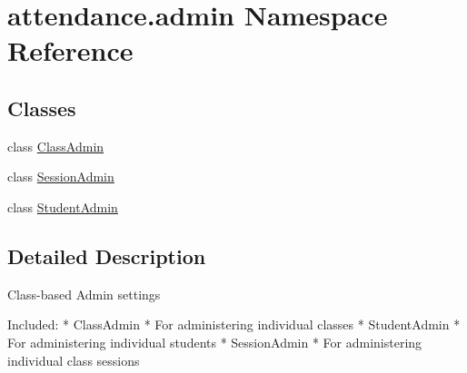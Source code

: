 \hypertarget{namespaceattendance_1_1admin}{}\section{attendance.\+admin Namespace Reference}
\label{namespaceattendance_1_1admin}
\subsection*{Classes}
\begin{DoxyCompactItemize}
\item 
class \hyperlink{classattendance_1_1admin_1_1_class_admin}{Class\+Admin}
\item 
class \hyperlink{classattendance_1_1admin_1_1_session_admin}{Session\+Admin}
\item 
class \hyperlink{classattendance_1_1admin_1_1_student_admin}{Student\+Admin}
\end{DoxyCompactItemize}


\subsection{Detailed Description}
\begin{DoxyVerb}Class-based Admin settings


Included:
* ClassAdmin
  * For administering individual classes
* StudentAdmin
  * For administering individual students
* SessionAdmin
  * For administering individual class sessions
\end{DoxyVerb}
 